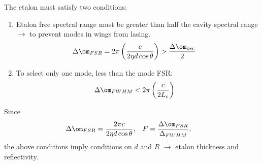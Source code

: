 \documentclass[a4paper, 11pt, normalem]{report}
\begin{document}
The etalon must satisfy two conditions:
\begin{enumerate}
    \item Etalon free spectral range must be greater than half the cavity spectral range $\to$ to prevent modes in wings from lasing. 
        \begin{align}
            \Delta\om_{FSR} &= 2\pi\left(\frac{c}{2\eta d\cos\theta}\right) > \frac{\Delta\om_{osc}}{2}
        \end{align}
    \item To select only one mode, less than the mode FSR:
        \begin{align}
            \Delta\om_{FWHM} &< 2\pi\left(\frac{c}{2L_c}\right)
        \end{align}
\end{enumerate}
Since 
\begin{align}
    \Delta\om_{FSR} &= \frac{2\pi c}{2\eta d\cos\theta}, & F &= \frac{\Delta\om_{FSR}}{\Delta_{FWHM}},
\end{align}
the above conditions imply conditions on $d$ and $R$ $\to$ etalon thickness and reflectivity. 
\end{document}
